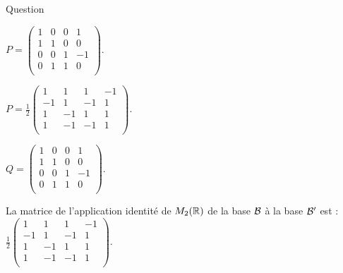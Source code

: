 \begin{multi}[multiple,feedback=
{\(P = \left(\begin{array}{rccc}
1&0&0&1\\
1&1&0&0\\ 
0&0&1&-1\\ 
0&1&1&0\\
\end{array}\right)\) et 
\(\displaystyle Q= \frac{1}{2}\left(\begin{array}{rccc}
1&1&1&-1\\
-1&1&-1&1\\ 
1&-1&1&1\\ 
1&-1&-1&1\\
\end{array}\right)\). Par définition, \(Q\) est la matrice de l'application identité de \(M_2(\Rr)\) de la base \({\cal {B}}\) à la base \({\cal {B'}}\).
}]{Question}
    \item* \(P = \left(\begin{array}{rccc}
1&0&0&1\\
1&1&0&0\\
0&0&1&-1\\
0&1&1&0\\
\end{array}\right).\)
    \item \(\displaystyle P = \frac{1}{2}\left(\begin{array}{rccc}
1&1&1&-1\\
-1&1&-1&1\\
1&-1&1&1\\
1&-1&-1&1\\
\end{array}\right).\)
    \item \(Q=\left(\begin{array}{rccc}
1&0&0&1\\
1&1&0&0\\
0&0&1&-1\\
0&1&1&0\\
\end{array}\right).\)
    \item* La matrice de l'application identité de \(M_2(\Rr)\) de la base \({\cal {B}}\) à la base \({\cal {B'}}\) est :
\(\displaystyle \frac{1}{2}\left(\begin{array}{rccc}
1&1&1&-1\\
-1&1&-1&1\\
1&-1&1&1\\
1&-1&-1&1\\
\end{array}\right).\)
\end{multi}


